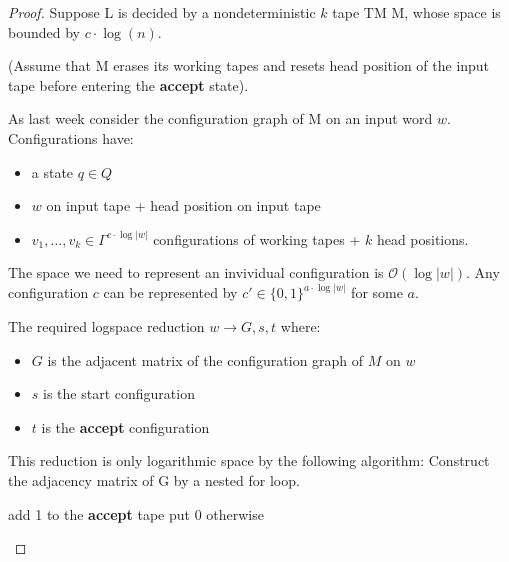 \documentclass[a4paper,12pt]{article}
\theoremstyle{definition}
\theoremstyle{remark}
\begin{document}
\begin{proof}
    Suppose L is decided by a nondeterministic $k$ tape TM M, whose space is bounded by $c \cdot \log(n)$.

    (Assume that M erases its working tapes and resets head position of the input tape before entering the \textbf{accept} state).

    As last week consider the configuration graph of M on an input word $w$. Configurations have:
    \begin{itemize}
        \item a state $q \in Q$
        \item $w$ on input tape + head position on input tape
        \item $v_1, \dots, v_k \in \Gamma^{c \cdot \log |w|}$ configurations of working tapes + $k$ head positions.
    \end{itemize}

    The space we need to represent an invividual configuration is $\mathscr{O}(\log |w|)$. Any configuration $c$ can be represented
    by $c' \in \{0, 1\}^{a \cdot \log|w|}$ for some $a$.

    The required logspace reduction $w \to G, s, t$ where:
    \begin{itemize}
        \item $G$ is the adjacent matrix of the configuration graph of $M$ on $w$
        \item $s$ is the start configuration
        \item $t$ is the \textbf{accept} configuration
    \end{itemize}

    This reduction is only logarithmic space by the following algorithm:
    Construct the adjacency matrix of G by a nested for loop.

    \begin{algorithm}[H]
        \begin{algorithmic}[1]
                        \State add 1 to the \textbf{accept} tape
                    \Else
                        \State put 0 otherwise
                    \EndIf
                \EndFor
            \EndFor
        \end{algorithmic}
        \end{algorithm}
\end{proof}
\end{document}
